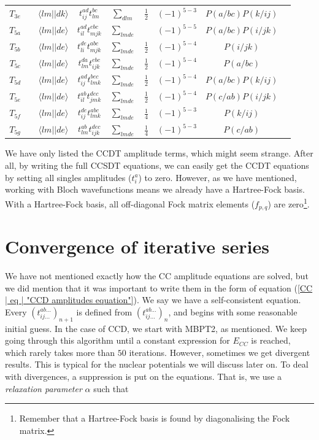 \documentclass[10pt,twoside]{report}
\begin{document}
\begin{table}[h]
\begin{tabular}{ccccccccc}
			$T_{3e}$ & & $\langle lm||dk \rangle$ & $t_{ij}^{ad}t_{lm}^{bc}$ & $\sum_{dlm}$ & $\frac{1}{2}$ & $(-1)^{5-3}$ & $P(a/bc)P(k/ij)$ &\\
			$T_{5a}$ & & $\langle lm||de \rangle$ & $t_{il}^{ad}t_{mjk}^{ebc}$ & $\sum_{lmde}$ & & $(-1)^{5-5}$ & $P(a/bc)P(i/jk)$ &\\
			$T_{5b}$ & & $\langle lm||de \rangle$ & $t_{li}^{de}t_{mjk}^{abc}$ & $\sum_{lmde}$ & $\frac{1}{2}$ & $(-1)^{5-4}$ & $P(i/jk)$ &\\
			$T_{5c}$ & & $\langle lm||de \rangle$ & $t_{lm}^{da}t_{ijk}^{ebc}$ & $\sum_{lmde}$ & $\frac{1}{2}$ & $(-1)^{5-4}$ & $P(a/bc)$ &\\
			$T_{5d}$ & & $\langle lm||de \rangle$ & $t_{ij}^{ad}t_{lmk}^{bec}$ & $\sum_{lmde}$ & $\frac{1}{2}$ & $(-1)^{5-4}$ & $P(a/bc)P(k/ij)$ &\\
			$T_{5e}$ & & $\langle lm||de \rangle$ & $t_{il}^{ab}t_{jmk}^{dec}$ & $\sum_{lmde}$ & $\frac{1}{2}$ & $(-1)^{5-4}$ & $P(c/ab)P(i/jk)$ &\\
			$T_{5f}$ & & $\langle lm||de \rangle$ & $t_{ij}^{de}t_{lmk}^{abc}$ & $\sum_{lmde}$ & $\frac{1}{4}$ & $(-1)^{5-3}$ & $P(k/ij)$ &\\
			$T_{5g}$ & & $\langle lm||de \rangle$ & $t_{lm}^{ab}t_{ijk}^{dec}$ & $\sum_{lmde}$ & $\frac{1}{4}$ & $(-1)^{5-3}$ & $P(c/ab)$ &\\ \hline
		\end{tabular}
		\label{CC | table | "CCDT T3 amp eq derivation"}
	\end{table} 
	
	We have only listed the CCDT amplitude terms, which might seem strange. After all, by writing the full CCSDT equations, we can easily get the CCDT equations by setting all singles amplitudes ($t_i^a$) to zero. However, as we have mentioned, working with Bloch wavefunctions means we already have a Hartree-Fock basis. With a Hartree-Fock basis, all off-diagonal Fock matrix elements ($f_{p,q}$) are zero\footnote{Remember that a Hartree-Fock basis is found by diagonalising the Fock matrix.}.
	
	\section{Convergence of iterative series}
	We have not mentioned exactly how the CC amplitude equations are solved, but we did mention that it was important to write them in the form of equation (\ref{CC | eq | "CCD amplitudes equation"}). We say we have a self-consistent equation. Every $(t_{ij\ldots}^{ab\ldots})_{n+1}$ is defined from $(t_{ij\ldots}^{ab\ldots})_{n}$, and begins with some reasonable initial guess. In the case of CCD, we start with MBPT2, as mentioned. We keep going through this algorithm until a constant expression for $E_{CC}$ is reached, which rarely takes more than $50$ iterations. However, sometimes we get divergent results. This is typical for the nuclear potentials we will discuss later on. To deal with divergences, a suppression is put on the equations. That is, we use a \emph{relaxation parameter} $\alpha$ such that
	
\end{document}
